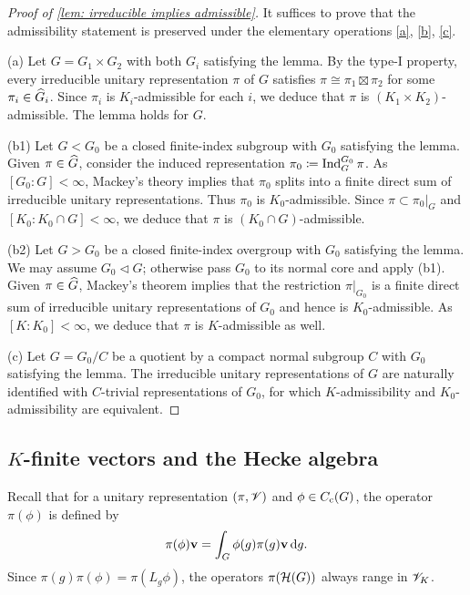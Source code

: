 \documentclass[a4paper, 10pt]{article}
\begin{document}
\begin{proof}[Proof of \autoref{lem: irreducible implies admissible}]
    It suffices to prove that the admissibility statement is preserved under the elementary operations \ref{a}, \ref{b}, \ref{c}.

    (a) Let $G=G_1\times G_2$ with both $G_i$ satisfying the lemma. By the type-I property, every irreducible unitary representation $\pi$ of $G$ satisfies $\pi\cong \pi_1\boxtimes \pi_2$ for some $\pi_i\in\widehat{G}_i$. Since $\pi_i$ is $K_i$-admissible for each $i$, we deduce that $\pi$ is $(K_1\times K_2)$-admissible. The lemma holds for $G$.

    (b1) Let $G<G_0$ be a closed finite-index subgroup with $G_0$ satisfying the lemma. Given $\pi\in\widehat{G}$, consider the induced representation $\pi_0\coloneq \operatorname{Ind}_G^{G_0}\pi$. As $[G_0:G]<\infty$, Mackey's theory implies that $\pi_0$ splits into a finite direct sum of irreducible unitary representations. Thus $\pi_0$ is $K_0$-admissible. Since $\pi\subset \pi_0|_G$ and $[K_0 : K_0\cap G]<\infty$, we deduce that $\pi$ is $(K_0\cap G)$-admissible.

    (b2) Let $G>G_0$ be a closed finite-index overgroup with $G_0$ satisfying the lemma. We may assume $G_0\lhd G$; otherwise pass $G_0$ to its normal core and apply (b1). Given $\pi\in\widehat{G}$, Mackey's theorem implies that the restriction $\pi|_{G_0}$ is a finite direct sum of irreducible unitary representations of $G_0$ and hence is $K_0$-admissible. As $[K:K_0]<\infty$, we deduce that $\pi$ is $K$-admissible as well.

    (c) Let $G=G_0/C$ be a quotient by a compact normal subgroup $C$ with $G_0$ satisfying the lemma. The irreducible unitary representations of $G$ are naturally identified with $C$-trivial representations of $G_0$, for which $K$-admissibility and $K_0$-admissibility are equivalent.
\end{proof}


\subsection{$K$-finite vectors and the Hecke algebra}
Recall that for a unitary representation $(\pi,\mathscr{V})$ and $\phi\in C_{\mathrm{c}}(G)$, the operator $\pi(\phi)$ is defined by
\begin{equation*}
    \pi(\phi)\mathbf{v} = \int_G \phi(g)\pi(g)\mathbf{v} \mathop{}\!\mathrm{d} g.
\end{equation*}
Since $\pi(g)\pi(\phi) = \pi(L_g \phi)$, the operators $\pi(\mathcal{H}(G))$ always range in $\mathscr{V}_K$.
\end{document}
